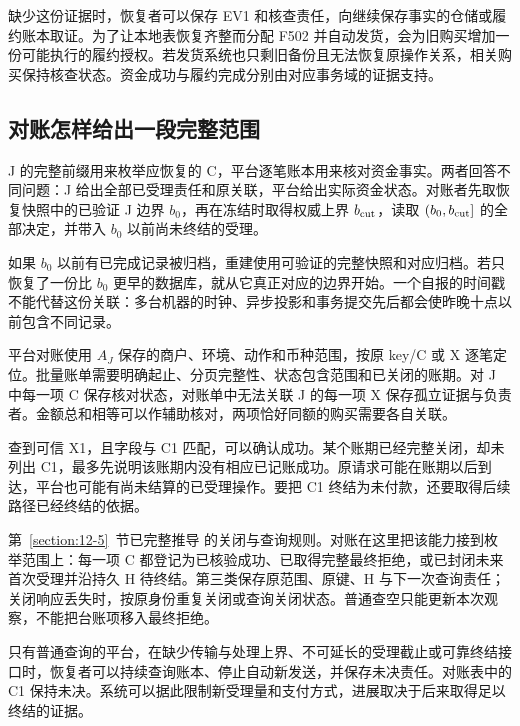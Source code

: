 缺少这份证据时，恢复者可以保存 EV1 和核查责任，向继续保存事实的仓储或履约账本取证。为了让本地表恢复齐整而分配 F502 并自动发货，会为旧购买增加一份可能执行的履约授权。若发货系统也只剩旧备份且无法恢复原操作关系，相关购买保持核查状态。资金成功与履约完成分别由对应事务域的证据支持。

\subsection*{对账怎样给出一段完整范围}

J 的完整前缀用来枚举应恢复的 C，平台逐笔账本用来核对资金事实。两者回答不同问题：J 给出全部已受理责任和原关联，平台给出实际资金状态。对账者先取恢复快照中的已验证 J 边界 $b_0$，再在冻结时取得权威上界 $b_{\rm cut}$，读取 $(b_0,b_{\rm cut}]$ 的全部决定，并带入 $b_0$ 以前尚未终结的受理。

如果 $b_0$ 以前有已完成记录被归档，重建使用可验证的完整快照和对应归档。若只恢复了一份比 $b_0$ 更早的数据库，就从它真正对应的边界开始。一个自报的时间戳不能代替这份关联：多台机器的时钟、异步投影和事务提交先后都会使昨晚十点以前包含不同记录。

平台对账使用 $A_J$ 保存的商户、环境、动作和币种范围，按原 key/C 或 X 逐笔定位。批量账单需要明确起止、分页完整性、状态包含范围和已关闭的账期。对 J 中每一项 C 保存核对状态，对账单中无法关联 J 的每一项 X 保存孤立证据与负责者。金额总和相等可以作辅助核对，两项恰好同额的购买需要各自关联。

查到可信 X1，且字段与 C1 匹配，可以确认成功。某个账期已经完整关闭，却未列出 C1，最多先说明该账期内没有相应已记账成功。原请求可能在账期以后到达，平台也可能有尚未结算的已受理操作。要把 C1 终结为未付款，还要取得后续路径已经终结的依据。

第~\ref{section:12-5}~节已完整推导  的关闭与查询规则。对账在这里把该能力接到枚举范围上：每一项 C 都登记为已核验成功、已取得完整最终拒绝，或已封闭未来首次受理并沿持久 H 待终结。第三类保存原范围、原键、H 与下一次查询责任；关闭响应丢失时，按原身份重复关闭或查询关闭状态。普通查空只能更新本次观察，不能把台账项移入最终拒绝。


只有普通查询的平台，在缺少传输与处理上界、不可延长的受理截止或可靠终结接口时，恢复者可以持续查询账本、停止自动新发送，并保存未决责任。对账表中的 C1 保持未决。系统可以据此限制新受理量和支付方式，进展取决于后来取得足以终结的证据。
\FloatBarrier
